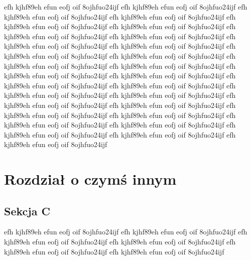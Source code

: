 \documentclass[a4paper,12pt]{book} %
\begin{document}
efh kjhf89eh efun eofj oif 8ojhfuo24ijf
efh kjhf89eh efun eofj oif 8ojhfuo24ijf
efh kjhf89eh efun eofj oif 8ojhfuo24ijf
efh kjhf89eh efun eofj oif 8ojhfuo24ijf
efh kjhf89eh efun eofj oif 8ojhfuo24ijf
efh kjhf89eh efun eofj oif 8ojhfuo24ijf
efh kjhf89eh efun eofj oif 8ojhfuo24ijf
efh kjhf89eh efun eofj oif 8ojhfuo24ijf
efh kjhf89eh efun eofj oif 8ojhfuo24ijf
efh kjhf89eh efun eofj oif 8ojhfuo24ijf
efh kjhf89eh efun eofj oif 8ojhfuo24ijf
efh kjhf89eh efun eofj oif 8ojhfuo24ijf
efh kjhf89eh efun eofj oif 8ojhfuo24ijf
efh kjhf89eh efun eofj oif 8ojhfuo24ijf
efh kjhf89eh efun eofj oif 8ojhfuo24ijf
efh kjhf89eh efun eofj oif 8ojhfuo24ijf
efh kjhf89eh efun eofj oif 8ojhfuo24ijf
efh kjhf89eh efun eofj oif 8ojhfuo24ijf
efh kjhf89eh efun eofj oif 8ojhfuo24ijf
efh kjhf89eh efun eofj oif 8ojhfuo24ijf
efh kjhf89eh efun eofj oif 8ojhfuo24ijf
efh kjhf89eh efun eofj oif 8ojhfuo24ijf
efh kjhf89eh efun eofj oif 8ojhfuo24ijf
efh kjhf89eh efun eofj oif 8ojhfuo24ijf
efh kjhf89eh efun eofj oif 8ojhfuo24ijf
efh kjhf89eh efun eofj oif 8ojhfuo24ijf
efh kjhf89eh efun eofj oif 8ojhfuo24ijf
efh kjhf89eh efun eofj oif 8ojhfuo24ijf
efh kjhf89eh efun eofj oif 8ojhfuo24ijf

\chapter{Rozdział o czymś innym}

\section{Sekcja C}

efh kjhf89eh efun eofj oif 8ojhfuo24ijf
efh kjhf89eh efun eofj oif 8ojhfuo24ijf
efh kjhf89eh efun eofj oif 8ojhfuo24ijf
efh kjhf89eh efun eofj oif 8ojhfuo24ijf
efh kjhf89eh efun eofj oif 8ojhfuo24ijf
efh kjhf89eh efun eofj oif 8ojhfuo24ijf
\end{document}
